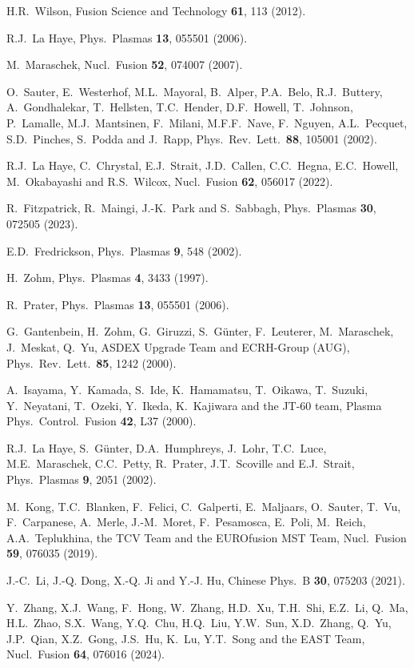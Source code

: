 \documentclass{iopjournal}
\begin{document}
\begin{thebibliography}{99}
 H.R.~Wilson, Fusion Science and Technology {\bf 61},  113 (2012). 
 
 R.J.~La Haye, Phys.\ Plasmas {\bf 13}, 055501 (2006).

 M.~Maraschek, Nucl.\ Fusion {\bf 52}, 074007 (2007). 

 O.~Sauter, E.~Westerhof, M.L.~Mayoral, B.~Alper, P.A.~Belo, R.J.~Buttery, A.~Gondhalekar, T.~Hellsten, T.C.~Hender, 
D.F.~Howell, T.~Johnson, P.~Lamalle, M.J.~Mantsinen, F.~Milani, M.F.F.~Nave, F.~Nguyen, A.L.~Pecquet, S.D.~Pinches, S.~Podda and J.~Rapp,
Phys.\ Rev.\ Lett.\ {\bf 88}, 105001 (2002).

 R.J.~La Haye, C.~Chrystal, E.J.~Strait, J.D.~Callen, C.C.~Hegna, E.C.~Howell, M.~Okabayashi and R.S.~Wilcox, Nucl.\ Fusion {\bf 62}, 056017 (2022).

  R.~Fitzpatrick, R.~Maingi, J.-K.~Park and S.~Sabbagh, Phys.\ Plasmas {\bf 30}, 072505 (2023).

 E.D.~Fredrickson, Phys.\ Plasmas {\bf 9}, 548 (2002).

 H.~Zohm, Phys.\ Plasmas {\bf 4}, 3433 (1997). 

 R.~Prater, Phys.\ Plasmas {\bf 13}, 055501 (2006).

 G.~Gantenbein, H.~Zohm, G.~Giruzzi, S.~G\"{u}nter, F.~Leuterer, M.~Maraschek, J.~Meskat, Q.~Yu,  ASDEX Upgrade Team and ECRH-Group (AUG), 
Phys.\ Rev.\ Lett.\ {\bf 85}, 1242 (2000). 

 A.~Isayama, Y.~Kamada, S.~Ide, K.~Hamamatsu, T.~Oikawa, T.~Suzuki, Y.~Neyatani, T.~Ozeki, Y.~Ikeda, K.~Kajiwara and the JT-60 team,  
Plasma Phys.\  Control.\ Fusion {\bf 42}, L37 (2000).

 R.J.~La Haye,  S.~G\"{u}nter,  D.A.~Humphreys,  J.~Lohr,  T.C.~Luce,  M.E.~Maraschek,  C.C.~Petty, R.~Prater,  J.T.~Scoville and E.J.~Strait,
 Phys.\ Plasmas {\bf 9}, 2051 (2002).
 
  M.~Kong, T.C.~Blanken, F.~Felici, C.~Galperti, E.~Maljaars,
O.~Sauter, T.~Vu, F.~Carpanese, A.~Merle, J.-M.~Moret, F.~Pesamosca, E.~Poli, M.~Reich, A.A.~Teplukhina, the TCV Team and the EUROfusion MST Team,
Nucl.\ Fusion {\bf 59}, 076035 (2019).

 J.-C.~Li, J.-Q. Dong, X.-Q. Ji and Y.-J. Hu,  Chinese Phys.\ B {\bf 30}, 075203 (2021).

 Y.~Zhang, X.J.~Wang, F.~Hong, W.~Zhang, H.D.~Xu, T.H.~Shi, E.Z.~Li, Q.~Ma, H.L.~Zhao, S.X.~Wang, Y.Q.~Chu, H.Q.~Liu, Y.W.~Sun, 
X.D.~Zhang, Q.~Yu, J.P.~Qian, X.Z.~Gong, J.S.~Hu, K.~Lu, Y.T.~Song and the EAST Team, 
 Nucl.\ Fusion {\bf 64},  076016 (2024).


\end{thebibliography}
\end{document}
